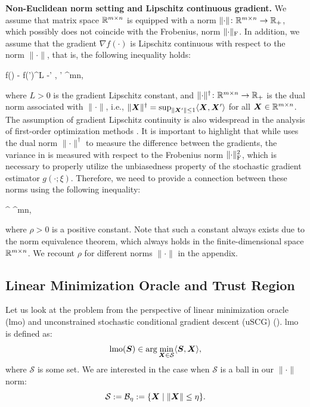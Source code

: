 \documentclass{article} %
\newcommand{\norm}[1]{\lVert #1\rVert}
\newcommand{\Rmn}{\R^{m\times n}}
\newcommand{\cB}{\mathcal{B}}
\newcommand{\cS}{\mathcal{S}}
\DeclarePairedDelimiter{\normf}{\|}{\|_\mathrm{F}}
\DeclarePairedDelimiter{\sqnf}{\|}{\|_{\mathrm{F}}^2}
\def\<#1,#2>{\langle #1,#2\rangle}
\newcounter{aequation}
\begin{document}
{\bf Non-Euclidean norm setting and Lipschitz continuous gradient.}
    We assume that matrix space $\Rmn$ is equipped with a norm $\norm{\cdot}\colon \Rmn \to \R_+$, which possibly does not coincide with the Frobenius, norm $\normf{\cdot}$. In addition, we assume that the gradient $\nabla f(\cdot)$ is Lipschitz continuous with respect to the norm $\norm{\cdot}$, that is, the following inequality holds:
    \begin{aequation}\label{eq:L}
    \norm{\nabla f(\mX) - \nabla f(\mX')}^\dagger \leq L \norm{\mX-\mX'}
    \quad{}\;
    \mX, \mX' \in \Rmn,
    \end{aequation}
    where $L > 0$ is the gradient Lipschitz constant, and $\norm{\cdot}^\dagger\colon \Rmn \to \R_+$ is the dual norm associated with $\norm{\cdot}$, i.e., $\norm{\mX}^\dagger = \sup_{\norm{\mX'}\leq 1} \<\mX,\mX'>$ for all $\mX \in \Rmn$. The assumption of gradient Lipschitz continuity is also widespread in the analysis of first-order optimization methods \citep{ghadimi2013stochastic,gower2019sgd,cutkosky2020momentum,horvath2023stochastic,gorbunov2020linearly}. It is important to highlight that while  uses the dual norm $\norm{\cdot}^\dagger$ to measure the difference between the gradients, the variance in  is measured with respect to the Frobenius norm $\sqnf{\cdot}$, which is necessary to properly utilize the unbiasedness property of the stochastic gradient estimator $g(\cdot;\xi)$. Therefore, we need to provide a connection between these norms using the following inequality:
    \begin{aequation}\label{eq:norm}
    \norm{\mX}^\dagger \leq \rho\cdot\normf{\mX}
    \quad{}\;
    \mX \in \Rmn,
    \end{aequation}
    where $\rho > 0$ is a positive constant. Note that such a constant always exists due to the norm equivalence theorem, which always holds in the finite-dimensional space $\Rmn$. We recount $\rho$ for different norms $\norm{\cdot}$ in the appendix.


\subsection{Linear Minimization Oracle and Trust Region}
    Let us look at the problem from the perspective of linear minimization oracle (lmo) and unconstrained stochastic conditional gradient descent (uSCG) (\cite{pethick2025training}). lmo is defined as:
    \begin{equation}\label{eq:lmo}
        \mathrm{lmo}(\mS) \in \arg\min_{\mX \in \cS} \<\mS, \mX>,
    \end{equation}
    where $\cS$ is some set. We are interested in the case when $\cS$ is a ball in our $\norm{\cdot}$ norm:
    \begin{equation}\label{eq:ball}
        \cS := \cB_\eta :=\{ \mX \mid \norm{\mX} \leq \eta \}.
    \end{equation}
\end{document}
